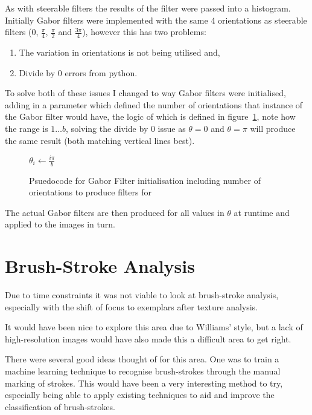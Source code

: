 As with steerable filters the results of the filter were passed into a histogram. Initially Gabor
filters were implemented with the same 4 orientations as steerable filters ($0$, $\frac{\pi}{4}$,
$\frac{\pi}{2}$ and $\frac{3\pi}{4}$), however this has two problems:

\begin{enumerate}
\item The variation in orientations is not being utilised and,
\item Divide by 0 errors from python.
\end{enumerate}

To solve both of these issues I changed to way Gabor filters were initialised, adding in a 
parameter which defined the number of orientations that instance of the Gabor filter would have,
the logic of which is defined in figure~\ref{fig:gabor-init}, note how the range is $1\dots b$, 
solving the divide by 0 issue as $\theta=0$ and $\theta=\pi$ will produce the same result (both
matching vertical lines best).

\begin{figure}[h]
\begin{algorithmic}
 
\State $\theta_i \gets \frac{i\pi}{b}$ 
\EndFor
\EndFunction
\end{algorithmic}
\caption{Psuedocode for Gabor Filter initialisation including number of orientations to produce 
filters for}\label{fig:gabor-init}
\end{figure}

The actual Gabor filters are then produced for all values in $\theta$ at runtime and applied to
the images in turn.

\section{Brush-Stroke Analysis}

Due to time constraints it was not viable to look at brush-stroke analysis, especially with the
shift of focus to exemplars after texture analysis.

It would have been nice to explore this area due to Williams' style, but a lack of high-resolution
images would have also made this a difficult area to get right.

There were several good ideas thought of for this area. One was to train a machine learning 
technique to recognise brush-strokes through the manual marking of strokes. This would have been a
very interesting method to try, especially being able to apply existing techniques to aid and
improve the classification of brush-strokes.

